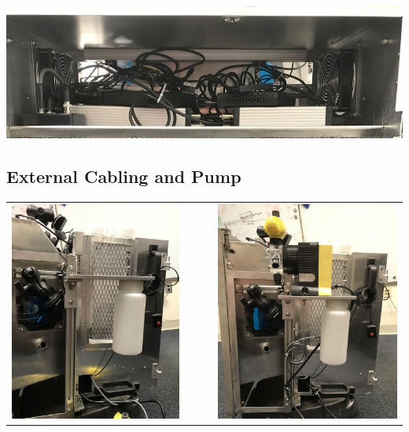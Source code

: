 \begin{center}
\includegraphics[width=0.9\columnwidth]
{photos/install-20181106/led-ncam-placement.jpg}
\end{center}

%
%
\clearpage
\subsection{External Cabling and Pump}
\label{sect-setup-howto-extcable}
\label{sect-setup-howto-pump}

\begin{tabular}{ccc}
\includegraphics[height=0.5\columnwidth]
{photos/install-20181106/ext-cabling.jpg} &
~~~ &
\includegraphics[height=0.5\columnwidth]
{photos/install-20181106/pump.jpg} \\
\end{tabular}

